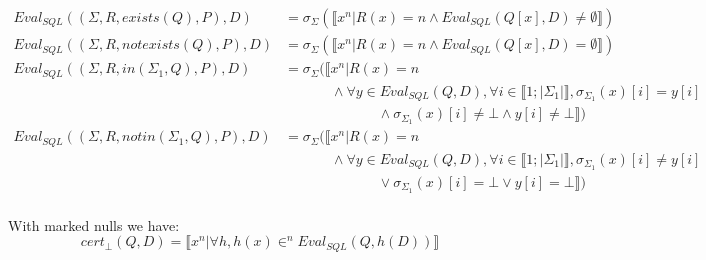 \begin{mydef}
\begin{align*}
	Eval_{SQL}((\Sigma,R,exists(Q),P),D) & =  \sigma_\Sigma( \llbracket x^n | R(x) = n \land Eval_{SQL}(Q[x],D) \neq \emptyset \rrbracket)\\
	Eval_{SQL}((\Sigma,R,notexists(Q),P),D) & =  \sigma_\Sigma( \llbracket x^n | R(x) = n \land Eval_{SQL}(Q[x],D) = \emptyset \rrbracket)\\
	Eval_{SQL}((\Sigma,R,in(\Sigma_1,Q),P),D) & =  \sigma_\Sigma( \llbracket x^n | R(x) = n \\ 
	& \; \; \; \; \; \; \; \; \; \; \; \; \land \forall y \in Eval_{SQL}(Q,D),\forall i \in \llbracket 1 ; |\Sigma_1| \rrbracket,  \sigma_{\Sigma_1}(x)[i] = y[i] \\ 
	& \; \; \; \; \; \; \; \; \; \; \; \; \; \; \; \; \; \; \; \; \; \; \; \; \land \sigma_{\Sigma_1}(x)[i] \neq \bot \land y[i] \neq \bot  \rrbracket)\\
	Eval_{SQL}((\Sigma,R,notin(\Sigma_1,Q),P),D) & =  \sigma_\Sigma( \llbracket x^n | R(x) = n \\ 
	&  \; \; \; \; \; \; \; \; \; \; \; \;  \land \forall y \in Eval_{SQL}(Q,D),\forall i \in \llbracket 1 ; |\Sigma_1| \rrbracket,  \sigma_{\Sigma_1}(x)[i] \neq y[i] \\ 
	& \; \; \; \; \; \; \; \; \; \; \; \; \; \; \; \; \; \; \; \; \; \; \; \; \lor \sigma_{\Sigma_1}(x)[i] = \bot \lor y[i] = \bot  \rrbracket)\\
\end{align*}
	
	\iffalse 
	\begin{align*}
		Eval_{SQL}(Q \setminus Q',D) & = 	Eval_{SQL}(Q,D) \setminus Eval_{SQL}(Q',D) \\
		Eval_{SQL}(Q \cup Q',D) & = 	Eval_{SQL}(Q,D) \cup Eval_{SQL}(Q',D) \\
		Eval_{SQL}(Q \uplus Q',D) & = 	Eval_{SQL}(Q,D) \uplus Eval_{SQL}(Q',D) \\
		Eval_{SQL}(Q \cap Q',D) & = 	Eval_{SQL}(Q,D) \cap Eval_{SQL}(Q',D) \\
		Eval_{SQL}(distinct(Q),D) & = 	\llbracket x^1 | x \in \{Eval_{SQL}(Q,D)\} \rrbracket \\
	\end{align*}
	\fi

\end{mydef}

\begin{mydef}
	With marked nulls we have:
	$$cert_\bot(Q,D) = \llbracket x^n | \forall h, h(x) \in^n Eval_{SQL}(Q,h(D)) \rrbracket$$
\end{mydef}

